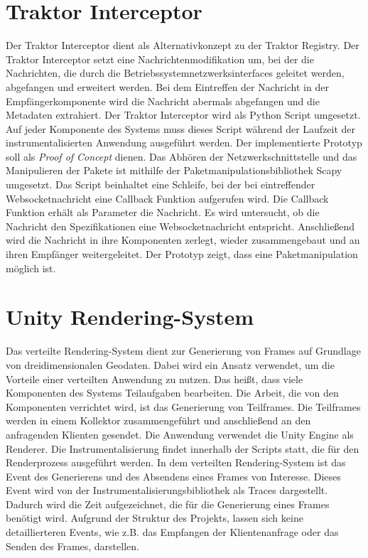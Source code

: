 \section{Traktor Interceptor}
\label{section:Traktor Interceptor}
Der Traktor Interceptor dient als Alternativkonzept zu der Traktor Registry. Der Traktor Interceptor setzt eine Nachrichtenmodifikation um, bei der die Nachrichten, die durch die Betriebssystemnetzwerksinterfaces geleitet werden, abgefangen und erweitert werden. Bei dem Eintreffen der Nachricht in der Empfängerkomponente wird die Nachricht abermals abgefangen und die Metadaten extrahiert. Der Traktor Interceptor wird als Python Script umgesetzt. Auf jeder Komponente des Systems muss dieses Script während der Laufzeit der instrumentalisierten Anwendung ausgeführt werden. Der implementierte Prototyp soll als \emph{Proof of Concept} dienen. Das Abhören der Netzwerkschnittstelle und das Manipulieren der Pakete ist mithilfe der Paketmanipulationsbibliothek Scapy umgesetzt. Das Script beinhaltet eine Schleife, bei der bei eintreffender Websocketnachricht eine Callback Funktion aufgerufen wird. Die Callback Funktion erhält als Parameter die Nachricht. Es wird untersucht, ob die Nachricht den Spezifikationen eine Websocketnachricht entspricht. Anschließend wird die Nachricht in ihre Komponenten zerlegt, wieder zusammengebaut und an ihren Empfänger weitergeleitet. Der Prototyp zeigt, dass eine Paketmanipulation möglich ist.

\section{Unity Rendering-System}
\label{section:Unity Rendering System}

Das verteilte Rendering-System dient zur Generierung von Frames auf Grundlage von dreidimensionalen Geodaten. Dabei wird ein Ansatz verwendet, um die Vorteile einer verteilten Anwendung zu nutzen. Das heißt, dass viele Komponenten des Systems Teilaufgaben bearbeiten. Die Arbeit, die von den Komponenten verrichtet wird, ist das Generierung von Teilframes. Die Teilframes werden in einem Kollektor zusammengeführt und anschließend an den anfragenden Klienten gesendet. Die Anwendung verwendet die Unity Engine als Renderer. Die Instrumentalisierung findet innerhalb der Scripts statt, die für den Renderprozess ausgeführt werden. In dem verteilten Rendering-System ist das Event des Generierens und des Absendens eines Frames von Interesse. Dieses Event wird von der Instrumentalisierungsbibliothek als Traces dargestellt.
Dadurch wird die Zeit aufgezeichnet, die für die Generierung eines Frames benötigt wird. Aufgrund der Struktur des Projekts, lassen sich keine detaillierteren Events, wie z.B. das Empfangen der Klientenanfrage oder das Senden des Frames, darstellen. 

